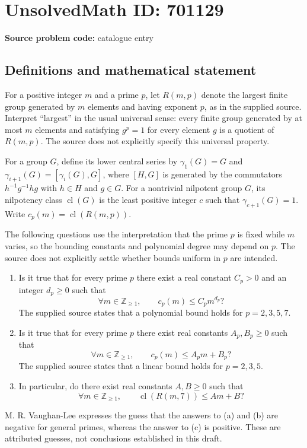\documentclass[11pt]{article}
\newcommand{\Z}{\mathbb{Z}}
\begin{document}
\section*{UnsolvedMath ID: 701129}
\textbf{Source problem code:} catalogue entry
\subsection{Definitions and mathematical statement}
For a positive integer \(m\) and a prime \(p\), let \(R(m,p)\) denote the largest finite group generated by \(m\) elements and having exponent \(p\), as in the supplied source. Interpret ``largest'' in the usual universal sense: every finite group generated by at most \(m\) elements and satisfying \(g^p=1\) for every element \(g\) is a quotient of \(R(m,p)\). The source does not explicitly specify this universal property.

For a group \(G\), define its lower central series by \(\gamma_1(G)=G\) and \(\gamma_{i+1}(G)=[\gamma_i(G),G]\), where \([H,G]\) is generated by the commutators \(h^{-1}g^{-1}hg\) with \(h\in H\) and \(g\in G\). For a nontrivial nilpotent group \(G\), its nilpotency class \(\operatorname{cl}(G)\) is the least positive integer \(c\) such that \(\gamma_{c+1}(G)=1\). Write \(c_p(m)=\operatorname{cl}(R(m,p))\).

The following questions use the interpretation that the prime \(p\) is fixed while \(m\) varies, so the bounding constants and polynomial degree may depend on \(p\). The source does not explicitly settle whether bounds uniform in \(p\) are intended.
\begin{enumerate}
\item[(a)] Is it true that for every prime \(p\) there exist a real constant \(C_p>0\) and an integer \(d_p\geq 0\) such that
\[
\forall m\in\Z_{\geq 1},\qquad c_p(m)\leq C_p m^{d_p}?
\]
The supplied source states that a polynomial bound holds for \(p=2,3,5,7\).
\item[(b)] Is it true that for every prime \(p\) there exist real constants \(A_p,B_p\geq 0\) such that
\[
\forall m\in\Z_{\geq 1},\qquad c_p(m)\leq A_p m+B_p?
\]
The supplied source states that a linear bound holds for \(p=2,3,5\).
\item[(c)] In particular, do there exist real constants \(A,B\geq 0\) such that
\[
\forall m\in\Z_{\geq 1},\qquad \operatorname{cl}(R(m,7))\leq Am+B?
\]
\end{enumerate}
M. R. Vaughan-Lee expresses the guess that the answers to (a) and (b) are negative for general primes, whereas the answer to (c) is positive. These are attributed guesses, not conclusions established in this draft.
\end{document}
